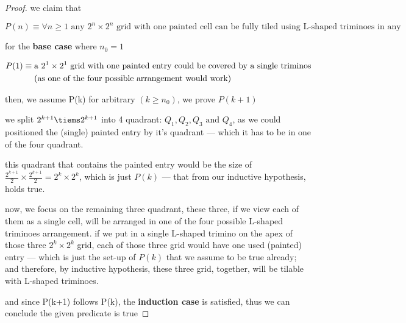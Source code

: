 \documentclass{article}
\theoremstyle{remark}
\begin{document}
\begin{proof}

    we claim that

    \[
        P(n) \equiv \forall n \ge 1 \text{ any $2^n \times 2^n$ grid with one painted cell can be fully tiled using L-shaped triminoes in any orientation}
    \]

    for the \textbf{base case} where $n_0 = 1$

    \begin{align*}
        P(1) &\equiv \text{a $2^1 \times 2^1$ grid with one painted entry could be covered by a single triminos} \\
        &\text{\hspace{1em} (as one of the four possible arrangement would work)}
    \end{align*}

    then, we assume P(k) for arbitrary $(k \ge n_0)$, we prove $P(k+1)$

    \vspace{1em}

    we split $2^{k+1} \tiems 2^{k+1}$ into 4 quadrant: $Q_1, Q_2, Q_3 \text{ and } Q_4$, as we could positioned the (single) painted entry by it's quadrant --- which it has to be in one of the four quadrant.

    \vspace{1em}

    this quadrant that contains the painted entry would be the size of $\frac{2^{k+1}}{2} \times \frac{2^{k+1}}{2} = 2^k \times 2^k$, which is just $P(k)$ --- that from our inductive hypothesis, holds true.

    \vspace{1em}

    now, we focus on the remaining three quadrant, these three, if we view each of them as a single cell, will be arranged in one of the four possible L-shaped triminoes arrangement. if we put in a single L-shaped trimino on the apex of those three $2^k \times 2^k$ grid, each of those three grid would have one used (painted) entry --- which is just the set-up of $P(k)$ that we assume to be true already; and therefore, by inductive hypothesis, these three grid, together, will be tilable with L-shaped triminoes.

    \vspace{1em}
    and since P(k+1) follows P(k), the \textbf{induction case} is satisfied, thus we can conclude the given predicate is true

\end{proof}
\end{document}
